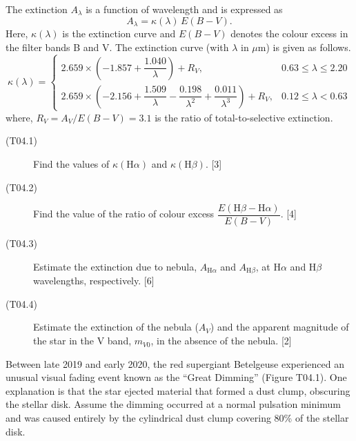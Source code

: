 The extinction $A_\lambda$ is a function of wavelength and is expressed as
\[ A_\lambda = \kappa(\lambda)\,E(B-V). \]
Here, $\kappa(\lambda)$ is the extinction curve and $E(B-V)$ denotes the
colour excess in the filter bands B and V. The extinction curve (with
$\lambda$ in $\mu$m) is given as follows.
\[ \kappa(\lambda) =
   \begin{cases}
     2.659 \times \left( -1.857 + \dfrac{1.040}{\lambda} \right) + R_V, &
       0.63 \le \lambda \le 2.20 \\[1ex]
     2.659 \times \left( -2.156 + \dfrac{1.509}{\lambda}
       - \dfrac{0.198}{\lambda^2} + \dfrac{0.011}{\lambda^3} \right) + R_V, &
       0.12 \le \lambda < 0.63
   \end{cases} \]
where, $R_V = A_V/E(B-V) = 3.1$ is the ratio of total-to-selective extinction.

\begin{description}
\item[(T04.1)] Find the values of $\kappa(\mathrm{H}\alpha)$ and
  $\kappa(\mathrm{H}\beta)$. \hfill[3]
\item[(T04.2)] Find the value of the ratio of colour excess
  $\dfrac{E(\mathrm{H}\beta - \mathrm{H}\alpha)}{E(B-V)}$. \hfill[4]
\item[(T04.3)] Estimate the extinction due to nebula, $A_{\mathrm{H}\alpha}$
  and $A_{\mathrm{H}\beta}$, at H$\alpha$ and H$\beta$ wavelengths,
  respectively. \hfill[6]
\item[(T04.4)] Estimate the extinction of the nebula ($A_V$) and the apparent
  magnitude of the star in the V band, $m_{V0}$, in the absence of the nebula.
  \hfill[2]
\end{description}

Between late 2019 and early 2020, the red supergiant Betelgeuse experienced an
unusual visual fading event known as the ``Great Dimming'' (Figure T04.1). One
explanation is that the star ejected material that formed a dust clump,
obscuring the stellar disk. Assume the dimming occurred at a normal pulsation
minimum and was caused entirely by the cylindrical dust clump covering 80\% of
the stellar disk.


